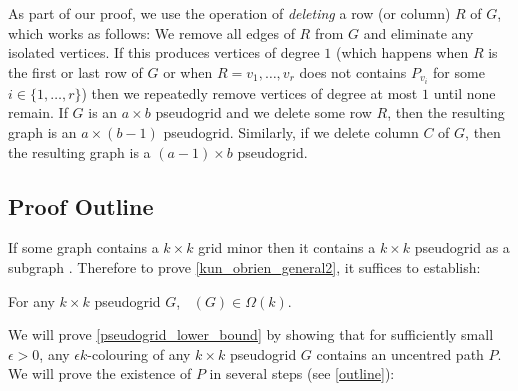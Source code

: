 \documentclass{patmorin}
\newcommand{\defin}[1]{\emph{\color{brightmaroon}#1}}
\DeclareMathOperator{\chilin}{\chi_{\mathrm{lin}}}
\begin{document}
As part of our proof, we use the operation of \defin{deleting} a row (or column) $R$ of $G$, which works as follows:  We remove all edges of $R$ from $G$ and eliminate any isolated vertices.  If this produces vertices of degree $1$ (which happens when $R$ is the first or last row of $G$ or when $R=v_1,\ldots,v_r$ does not contains $P_{v_i}$ for some $i\in\{1,\ldots,r\}$) then we repeatedly remove vertices of degree at most $1$ until none remain.  If $G$ is an $a\times b$ pseudogrid and we delete some row $R$, then the resulting graph is an $a\times (b-1)$ pseudogrid.  Similarly, if we delete column $C$ of $G$, then the resulting graph is a $(a-1)\times b$ pseudogrid.

\subsection{Proof Outline}

If some graph contains a $k\times k$ grid minor then it contains a $k\times k$ pseudogrid as a subgraph \cite{kun.obrien.ea:polynomial}.  Therefore to prove \cref{kun_obrien_general2}, it suffices to establish:

\begin{lem}\label{pseudogrid_lower_bound}
  For any $k\times k$ pseudogrid $G$, $\chilin(G)\in\Omega(k)$.
\end{lem}

We will prove \cref{pseudogrid_lower_bound} by showing that for sufficiently small $\epsilon >0$,  any $\epsilon k$-colouring of any $k\times k$ pseudogrid $G$ contains an uncentred path $P$. We will prove the existence of $P$ in several steps (see \cref{outline}):
\end{document}
